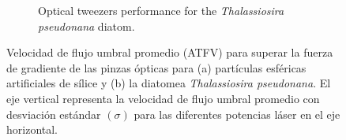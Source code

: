 \documentclass[10pt,aspectratio=1610,compress,dvipsnames]{beamer}
\begin{document}
\begin{frame}
{\begin{figure}[H]
\begin{subfigure}[b]{0.49\textwidth}
         \caption{Optical tweezers performance for the \textit{Thalassiosira pseudonana} diatom.}
         \label{fig:three sin x}
     \end{subfigure}
     \caption{Velocidad de flujo umbral promedio (ATFV) para superar la fuerza de gradiente de las pinzas ópticas para (a) partículas esféricas artificiales de sílice y (b) la diatomea \textit{Thalassiosira pseudonana}. El eje vertical representa la velocidad de flujo umbral promedio con desviación estándar $(\sigma)$ para las diferentes potencias láser en el eje horizontal.}
     \hfill
    \label{graficasmicrofluidics} 
\end{figure}


}

\end{frame}
\end{document}
